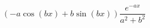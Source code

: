 \begin{displaymath}
 \left( -a\cos(bx) + b\sin(bx)\right) \frac{e^{-ax}}{a^2+b^2}
\end{displaymath}
